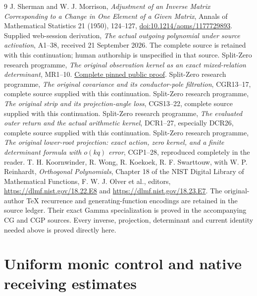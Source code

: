 \documentclass[11pt]{article}
\begin{document}
\begin{thebibliography}{9}
 J. Sherman and W. J. Morrison,
\emph{Adjustment of an Inverse Matrix Corresponding to a Change
in One Element of a Given Matrix}, Annals of Mathematical Statistics
21 (1950), 124--127,
\href{https://doi.org/10.1214/aoms/1177729893}{doi:10.1214/aoms/1177729893}.
 Supplied web-session derivation,
\emph{The actual outgoing polynomial under source activation},
A1--38, received 21 September 2026. The complete source is retained
with this continuation; human authorship is unspecified in that source.
 Split-Zero research programme,
\emph{The original observation kernel as an exact mixed-relation
determinant}, MR1--10.
\href{https://github.com/KokunoYumeto/zeta-function-research-reader/blob/5992ad50c0f2a06921f1fcaded7b4e38097c0739/workbenches/splitzero-tandem/continuations/20260920-original-kernel-mixed-determinants/ORIGINAL_KERNEL_MIXED_DETERMINANT.tex#L36}{Complete pinned public proof}.
 Split-Zero research programme,
\emph{The original covariance and its conductor-pole filtration},
CGR13--17, complete source supplied with this continuation.
 Split-Zero research programme,
\emph{The original strip and its projection-angle loss},
CGS13--22, complete source supplied with this continuation.
 Split-Zero research programme,
\emph{The evaluated outer return and the actual arithmetic kernel},
DCR1--27, especially DCR26, complete source supplied with this continuation.
 Split-Zero research programme,
\emph{The original lower-root projection: exact action, zero kernel,
and a finite determinant formula with \(o(kq)\) error},
CGP1--28, reproduced completely in the reader.
 T. H. Koornwinder, R. Wong, R. Koekoek,
R. F. Swarttouw, with W. P. Reinhardt,
\emph{Orthogonal Polynomials}, Chapter 18 of the
NIST Digital Library of Mathematical Functions,
F. W. J. Olver et al., editors,
\url{https://dlmf.nist.gov/18.22.E8} and
\url{https://dlmf.nist.gov/18.23.E7}.
The original-author TeX recurrence and generating-function encodings
are retained in the source ledger. Their exact Gamma specialization is
proved in the accompanying CG and CGP sources. Every inverse, projection,
determinant and current identity needed above is proved directly here.
\end{thebibliography}
\clearpage\part{Uniform monic control and native receiving estimates}
\end{document}
